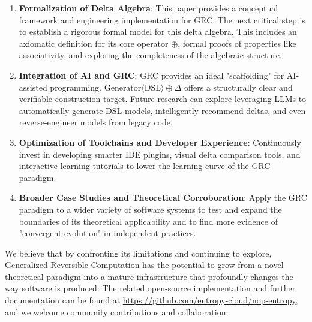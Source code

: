 \documentclass[11pt]{article}
\begin{document}
\begin{enumerate}
    \item \textbf{Formalization of Delta Algebra}: This paper provides a conceptual framework and engineering implementation for GRC. The next critical step is to establish a rigorous formal model for this delta algebra. This includes an axiomatic definition for its core operator $\oplus$, formal proofs of properties like associativity, and exploring the completeness of the algebraic structure.
    \item \textbf{Integration of AI and GRC}: GRC provides an ideal "scaffolding" for AI-assisted programming. $\text{Generator}\langle\text{DSL}\rangle \oplus \Delta$ offers a structurally clear and verifiable construction target. Future research can explore leveraging LLMs to automatically generate DSL models, intelligently recommend deltas, and even reverse-engineer models from legacy code.
    \item \textbf{Optimization of Toolchains and Developer Experience}: Continuously invest in developing smarter IDE plugins, visual delta comparison tools, and interactive learning tutorials to lower the learning curve of the GRC paradigm.
    \item \textbf{Broader Case Studies and Theoretical Corroboration}: Apply the GRC paradigm to a wider variety of software systems to test and expand the boundaries of its theoretical applicability and to find more evidence of "convergent evolution" in independent practices.
\end{enumerate}

We believe that by confronting its limitations and continuing to explore, Generalized Reversible Computation has the potential to grow from a novel theoretical paradigm into a mature infrastructure that profoundly changes the way software is produced. The related open-source implementation and further documentation can be found at \url{https://github.com/entropy-cloud/nop-entropy}, and we welcome community contributions and collaboration.
\end{document}
